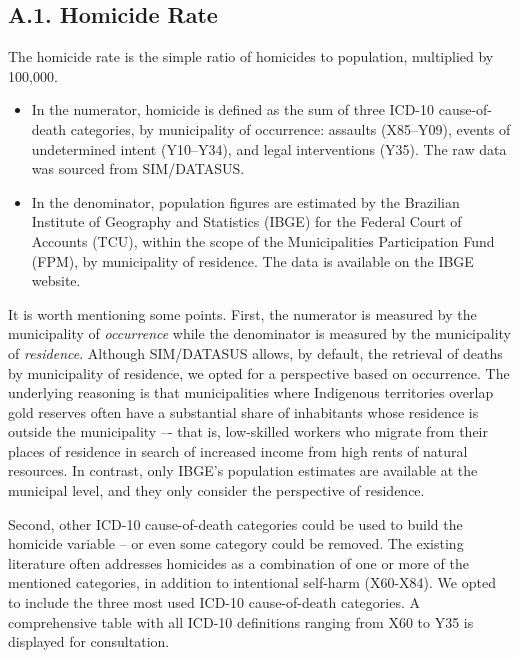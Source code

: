 \documentclass[preprint,12pt]{elsarticle}
\renewcommand{\arraystretch}{1.2}
\begin{document}
\subsection*{A.1. Homicide Rate}

The homicide rate is the simple ratio of homicides to population, multiplied by 100,000.

\begin{itemize}
    \item In the numerator, homicide is defined as the sum of three ICD-10 cause-of-death categories, by municipality of occurrence: assaults (X85–Y09), events of undetermined intent (Y10–Y34), and legal interventions (Y35). The raw data was sourced from SIM/DATASUS.
    
    \item In the denominator, population figures are estimated by the Brazilian Institute of Geography and Statistics (IBGE) for the Federal Court of Accounts (TCU), within the scope of the Municipalities Participation Fund (FPM), by municipality of residence. The data is available on the IBGE website.
\end{itemize}

It is worth mentioning some points. First, the numerator is measured by the municipality of \textit{occurrence} while the denominator is measured by the municipality of \textit{residence}. Although SIM/DATASUS allows, by default, the retrieval of deaths by municipality of residence, we opted for a perspective based on occurrence. The underlying reasoning is that municipalities where Indigenous territories overlap gold reserves often have a substantial share of inhabitants whose residence is outside the municipality –- that is, low-skilled workers who migrate from their places of residence in search of increased income from high rents of natural resources. In contrast, only IBGE's population estimates are available at the municipal level, and they only consider the perspective of residence.

Second, other ICD-10 cause-of-death categories could be used to build the homicide variable -- or even some category could be removed. The existing literature often addresses homicides as a combination of one or more of the mentioned categories, in addition to intentional self-harm (X60-X84). We opted to include the three most used ICD-10 cause-of-death categories. A comprehensive table with all ICD-10 definitions ranging from X60 to Y35 is displayed for consultation.

\begingroup
\small
\renewcommand{\arraystretch}{1.2}
\setlength{\tabcolsep}{3.5pt}

\endgroup
\end{document}
